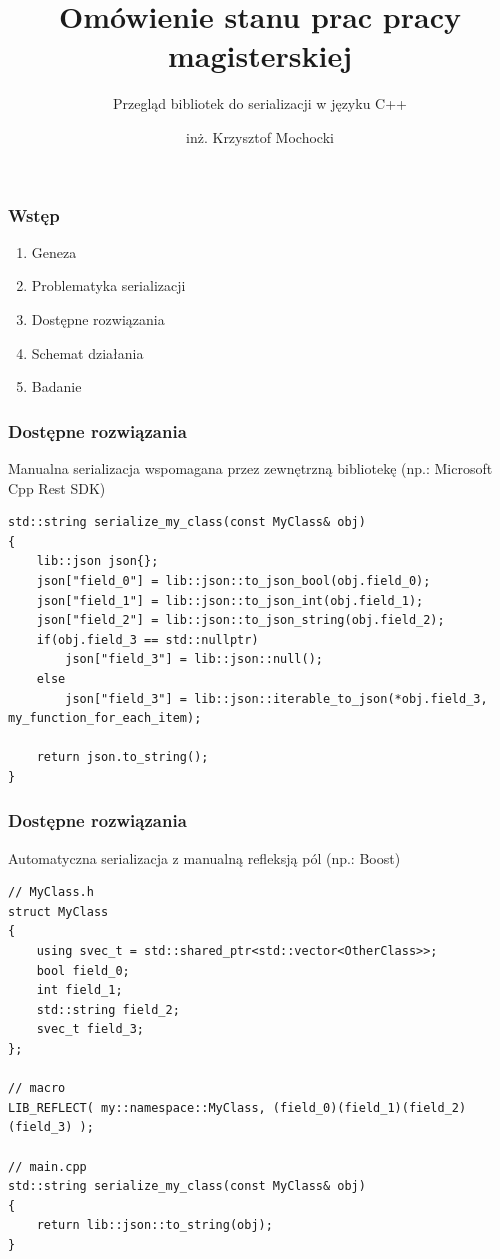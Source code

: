 \documentclass[12pt]{beamer}
\title{Omówienie stanu prac pracy magisterskiej}
\subtitle{Przegląd bibliotek do serializacji w języku C++}
\author[inż. Krzysztof Mochocki]{inż. Krzysztof Mochocki}
\date{}
\begin{document}
	\begin{frame}
		\maketitle
	\end{frame}

	\begin{frame}
		\frametitle{Wstęp}
		\begin{enumerate}
			\item Geneza
			\item Problematyka serializacji
			\item Dostępne rozwiązania
			\item Schemat działania
			\item Badanie
		\end{enumerate}
	\end{frame}

	\begin{frame}[fragile]
		\frametitle{Dostępne rozwiązania}

		Manualna serializacja wspomagana przez zewnętrzną bibliotekę (np.: Microsoft Cpp Rest SDK)\newline

		\begin{lstlisting}[frame=single]
std::string serialize_my_class(const MyClass& obj)
{
	lib::json json{};
	json["field_0"] = lib::json::to_json_bool(obj.field_0);
	json["field_1"] = lib::json::to_json_int(obj.field_1);
	json["field_2"] = lib::json::to_json_string(obj.field_2);
	if(obj.field_3 == std::nullptr)
		json["field_3"] = lib::json::null();
	else
		json["field_3"] = lib::json::iterable_to_json(*obj.field_3, my_function_for_each_item);

	return json.to_string();
}
		\end{lstlisting}

	\end{frame}

	\begin{frame}[fragile]
		\frametitle{Dostępne rozwiązania}

		Automatyczna serializacja z manualną refleksją pól \newline(np.: Boost)

		\begin{lstlisting}[frame=single]
// MyClass.h
struct MyClass
{
	using svec_t = std::shared_ptr<std::vector<OtherClass>>;
	bool field_0;
	int field_1;
	std::string field_2;
	svec_t field_3;
};

// macro
LIB_REFLECT( my::namespace::MyClass, (field_0)(field_1)(field_2)(field_3) );

// main.cpp
std::string serialize_my_class(const MyClass& obj)
{
	return lib::json::to_string(obj);
}
		\end{lstlisting}

	\end{frame}
\end{document}
